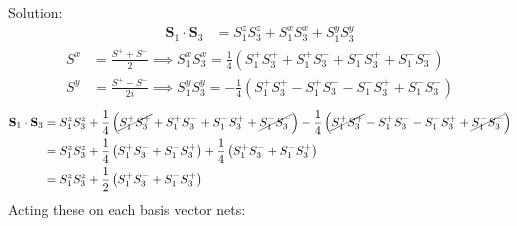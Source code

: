 \begin{homeworkProblem}
\begin{enumerate}[a.]
\begin{callout}{Solution:}
            \begin{align*}
                \mathbf{S}_1 \cdot \mathbf{S}_3 &= S_1^{z}S_3^{z} + S_1^{x}S_3^{x} + S_1^{y}S_3^{y}
            \end{align*}
            \begin{align*}
                S^{x} &= \frac{S^{+} + S^{-}}{2} \implies  S_{1}^{x}S_{3}^{x} = \frac{1}{4}\left(S^{+}_1 S^{+}_3 + S^{+}_1 S^{-}_3 + S^{-}_1 S^{+}_3 + S^{-}_1 S^{-}_3 \right) \\
                S^{y} &= \frac{S^{+}-S^{-}}{2i} \implies  S_{1}^{y}S_{3}^{y} = -\frac{1}{4}\left(S^{+}_1 S^{+}_3 - S^{+}_1 S^{-}_3 - S^{-}_1 S^{+}_3 + S^{-}_1 S^{-}_3 \right)
            \end{align*}
            \begin{align*}
                \mathbf{S}_1 \cdot \mathbf{S}_3 &= S_1^{z}S_3^{z} + \frac{1}{4}\left(\cancel{ S^{+}_1 S^{+}_3  }+ S^{+}_1 S^{-}_3 + S^{-}_1 S^{+}_3 + \cancel{ S^{-}_1 S^{-}_3 } \right) - \frac{1}{4}\left(\cancel{ S^{+}_1 S^{+}_3 } - S^{+}_1 S^{-}_3 - S^{-}_1 S^{+}_3 + \cancel{ S^{-}_1 S^{-}_3 } \right) \\
                &= S_1^{z}S_3^{z} + \frac{1}{4}\left(S^{+}_1 S^{-}_3 + S^{-}_1 S^{+}_3 \right) + \frac{1}{4}\left(S^{+}_1 S^{-}_3 + S^{-}_1 S^{+}_3 \right) \\
                &= S_1^{z}S_3^{z} + \frac{1}{2}\left(S^{+}_1 S^{-}_3 + S^{-}_1 S^{+}_3 \right)
            \end{align*}
            Acting these on each basis vector nets:


\end{callout}
\end{enumerate}
\end{homeworkProblem}
